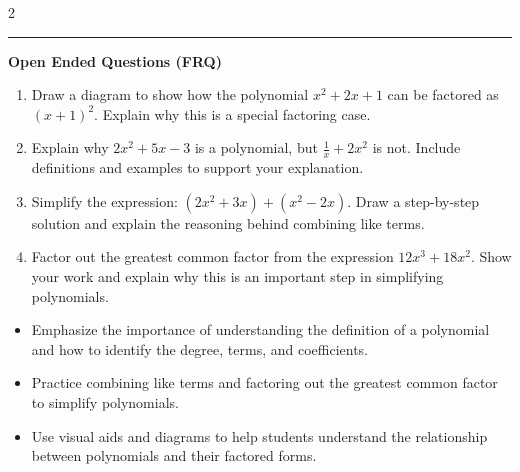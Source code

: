 \documentclass[10pt]{article}
\begin{document}
\begin{multicols}{2}
\begin{enumerate}[label=\textbf{Q\arabic*.}, leftmargin=*, itemsep=6pt, parsep=0pt]
\end{enumerate}
\end{multicols}

\vspace{-0.2cm}
\hrule
\vspace{0.2cm}
\textbf{\small Open Ended Questions (FRQ)}
\begin{enumerate}[label=\textbf{Q\arabic*.}, start=9, itemsep=5pt, topsep=0pt]

  \item \small Draw a diagram to show how the polynomial $x^2 + 2x + 1$ can be factored as $(x + 1)^2$. Explain why this is a special factoring case. \vspace{2cm}

  \item \small Explain why $2x^2 + 5x - 3$ is a polynomial, but $\frac{1}{x} + 2x^2$ is not. Include definitions and examples to support your explanation. \vspace{2cm}

  \item \small Simplify the expression: $(2x^2 + 3x) + (x^2 - 2x)$. Draw a step-by-step solution and explain the reasoning behind combining like terms. \vspace{2cm}

  \item \small Factor out the greatest common factor from the expression $12x^3 + 18x^2$. Show your work and explain why this is an important step in simplifying polynomials. \vspace{2cm}

\end{enumerate}

\vfill

\begin{tcolorbox}[colback=blue!5, colframe=mainblue!50, title=\small \textbf{Chef's Tips}, fonttitle=\bfseries, bottom=1mm]
\begin{itemize}[noitemsep, topsep=2pt, leftmargin=0.5cm]
  \item \scriptsize Emphasize the importance of understanding the definition of a polynomial and how to identify the degree, terms, and coefficients.\item \scriptsize Practice combining like terms and factoring out the greatest common factor to simplify polynomials.\item \scriptsize Use visual aids and diagrams to help students understand the relationship between polynomials and their factored forms.
\end{itemize}
\end{tcolorbox}
\end{document}
